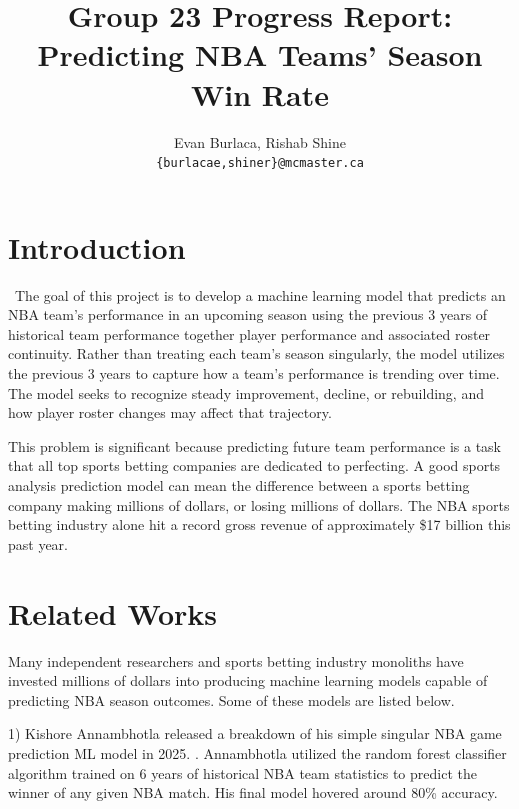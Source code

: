 \documentclass[11pt]{article}
\title{Group 23 Progress Report:\\Predicting NBA Teams' Season Win Rate}
\author{Evan Burlaca, Rishab Shine \\
  \texttt{\{burlacae,shiner\}@mcmaster.ca} }
\begin{document}
\maketitle

\section{Introduction}

\
The goal of this project is to develop a machine learning model that predicts an NBA team's performance in an upcoming season using the previous 3 years of historical team performance together player performance and associated roster continuity. Rather than treating each team's season singularly, the model utilizes the previous 3 years to capture how a team's performance is trending over time. The model seeks to recognize steady improvement, decline, or rebuilding, and how player roster changes may affect that trajectory.
\medskip

This problem is significant because predicting future team performance is a task that all top sports betting companies are dedicated to perfecting. A good sports analysis prediction model can mean the difference between a sports betting company making millions of dollars, or losing millions of dollars. The NBA sports betting industry alone hit a record gross revenue of approximately \$17 billion this past year.

\section{Related Works}


Many independent researchers and sports betting industry monoliths have invested millions of dollars into producing machine learning models capable of predicting NBA season outcomes. Some of these models are listed below.
\medskip

1)  Kishore Annambhotla released a breakdown of his simple singular NBA game prediction ML model in 2025. \citep{Annambhotla2025}. Annambhotla utilized the random forest classifier algorithm trained on 6 years of historical NBA team statistics to predict the winner of any given NBA match. His final model hovered around  80\% accuracy.
\medskip
\end{document}
